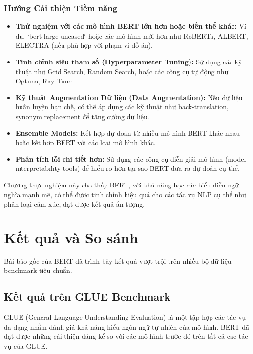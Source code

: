 \subsubsection{Hướng Cải thiện Tiềm năng}
\begin{itemize}
    \item \textbf{Thử nghiệm với các mô hình BERT lớn hơn hoặc biến thể khác:} Ví dụ, `bert-large-uncased` hoặc các mô hình mới hơn như RoBERTa, ALBERT, ELECTRA (nếu phù hợp với phạm vi đồ án).
    \item \textbf{Tinh chỉnh siêu tham số (Hyperparameter Tuning):} Sử dụng các kỹ thuật như Grid Search, Random Search, hoặc các công cụ tự động như Optuna, Ray Tune.
    \item \textbf{Kỹ thuật Augmentation Dữ liệu (Data Augmentation):} Nếu dữ liệu huấn luyện hạn chế, có thể áp dụng các kỹ thuật như back-translation, synonym replacement để tăng cường dữ liệu.
    \item \textbf{Ensemble Models:} Kết hợp dự đoán từ nhiều mô hình BERT khác nhau hoặc kết hợp BERT với các loại mô hình khác.
    \item \textbf{Phân tích lỗi chi tiết hơn:} Sử dụng các công cụ diễn giải mô hình (model interpretability tools) để hiểu rõ hơn tại sao BERT đưa ra dự đoán cụ thể.
\end{itemize}
Chương thực nghiệm này cho thấy BERT, với khả năng học các biểu diễn ngữ nghĩa mạnh mẽ, có thể được tinh chỉnh hiệu quả cho các tác vụ NLP cụ thể như phân loại cảm xúc, đạt được kết quả ấn tượng.

\section{Kết quả và So sánh}
\label{sec:ket_qua_so_sanh}
Bài báo gốc của BERT \cite{devlin2018bert} đã trình bày kết quả vượt trội trên nhiều bộ dữ liệu benchmark tiêu chuẩn.

\subsection{Kết quả trên GLUE Benchmark}
\label{ssec:ket_qua_glue}
GLUE (General Language Understanding Evaluation) \cite{wang2018glue} là một tập hợp các tác vụ đa dạng nhằm đánh giá khả năng hiểu ngôn ngữ tự nhiên của mô hình. BERT đã đạt được những cải thiện đáng kể so với các mô hình trước đó trên tất cả các tác vụ của GLUE.

